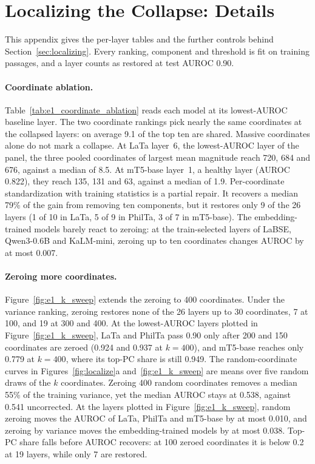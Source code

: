 \documentclass[11pt]{article}
\begin{document}


\FloatBarrier
\section{Localizing the Collapse: Details}
\label{app:localizing}

This appendix gives the per-layer tables and the further controls behind Section~\ref{sec:localizing}.
Every ranking, component and threshold is fit on training passages, and a layer counts as restored at test AUROC 0.90.

\paragraph{Coordinate ablation.}
Table~\ref{tab:e1_coordinate_ablation} reads each model at its lowest-AUROC baseline layer.
The two coordinate rankings pick nearly the same coordinates at the collapsed layers: on average 9.1 of the top ten are shared.
Massive coordinates alone do not mark a collapse.
At LaTa layer~6, the lowest-AUROC layer of the panel, the three pooled coordinates of largest mean magnitude reach 720, 684 and 676, against a median of 8.5.
At mT5-base layer~1, a healthy layer (AUROC 0.822), they reach 135, 131 and 63, against a median of 1.9.
Per-coordinate standardization with training statistics \citep{timkey2021rogue} is a partial repair.
It recovers a median 79\% of the gain from removing ten components, but it restores only 9 of the 26 layers (1 of 10 in LaTa, 5 of 9 in PhilTa, 3 of 7 in mT5-base).
The embedding-trained models barely react to zeroing: at the train-selected layers of LaBSE, Qwen3-0.6B and KaLM-mini, zeroing up to ten coordinates changes AUROC by at most 0.007.



\paragraph{Zeroing more coordinates.}
Figure~\ref{fig:e1_k_sweep} extends the zeroing to 400 coordinates.
Under the variance ranking, zeroing restores none of the 26 layers up to 30 coordinates, 7 at 100, and 19 at 300 and 400.
At the lowest-AUROC layers plotted in Figure~\ref{fig:e1_k_sweep}, LaTa and PhilTa pass 0.90 only after 200 and 150 coordinates are zeroed (0.924 and 0.937 at $k=400$), and mT5-base reaches only 0.779 at $k=400$, where its top-PC share is still 0.949.
The random-coordinate curves in Figures~\ref{fig:localize}a and~\ref{fig:e1_k_sweep} are means over five random draws of the $k$ coordinates.
Zeroing 400 random coordinates removes a median 55\% of the training variance, yet the median AUROC stays at 0.538, against 0.541 uncorrected.
At the layers plotted in Figure~\ref{fig:e1_k_sweep}, random zeroing moves the AUROC of LaTa, PhilTa and mT5-base by at most 0.010, and zeroing by variance moves the embedding-trained models by at most 0.038.
Top-PC share falls before AUROC recovers: at 100 zeroed coordinates it is below 0.2 at 19 layers, while only 7 are restored.
\end{document}
